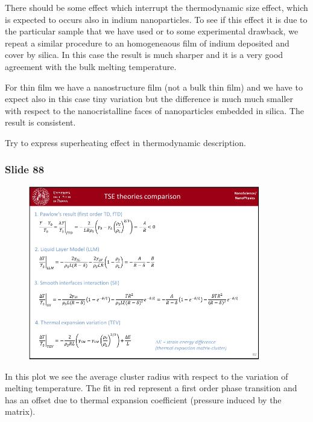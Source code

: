 \documentclass[../main/main.tex]{subfiles}
\begin{document}
There should be some effect which interrupt the thermodynamic size effect, which is expected to occurs also in indium nanoparticles. To see if this effect it is due to the particular sample that we have used or to some experimental drawback, we repeat a similar procedure to an homogeneaous film of indium deposited and cover by silica. In this case the result is much sharper and it is a very good agreement with the bulk melting temperature.

For thin film we have a nanostructure film (not a bulk thin film) and we have to expect also in this case tiny variation but the difference is much much smaller with respect to the nanocristalline faces of nanoparticles embedded in silica. The result is consistent.

Try to express superheating effect in thermodynamic description.

\newpage

\subsubsection{Slide 88}

\begin{figure}[h!]
\centering
\includegraphics[page=7,width=0.9\textwidth]{../lessons/pdf_file/5_lesson.pdf}
\end{figure}

In this plot we see the average cluster radius with respect to the variation of melting temperature.
The fit in red represent a first order phase transition and has an offset due to thermal expansion coefficient (pressure induced by the matrix).

\newpage 
\end{document}
